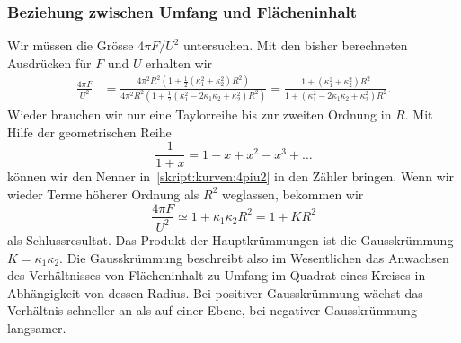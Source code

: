 \subsubsection{Beziehung zwischen Umfang und Flächeninhalt}
Wir müssen die Grösse $4\pi F/U^2$ untersuchen.
Mit den bisher berechneten Ausdrücken für $F$ und $U$ erhalten wir
\begin{align}
\frac{4\pi F}{U^2}
&=
\frac{4\pi^2R^2(1+{\textstyle\frac12}(\kappa_1^2 + \kappa_2^2)R^2)}%
{4\pi^2 R^2(1+{\textstyle\frac12}(\kappa_1^2-2\kappa_1\kappa_2+\kappa_2^2)R^2)}
=
\frac{1+(\kappa_1^2 + \kappa_2^2)R^2}%
{1+(\kappa_1^2-2\kappa_1\kappa_2+\kappa_2^2)R^2}.
\label{skript:kurven:4piu2}
\end{align}
Wieder brauchen wir nur eine Taylorreihe bis zur zweiten Ordnung in $R$.
Mit Hilfe der geometrischen Reihe 
\[
\frac1{1+x}= 1-x+x^2-x^3+\dots
\]
können wir den Nenner in~\eqref{skript:kurven:4piu2} in den Zähler
bringen.
Wenn wir wieder Terme höherer Ordnung als $R^2$ weglassen, bekommen
wir 
\begin{equation}
\frac{4\pi F}{U^2}
\simeq
1+\kappa_1\kappa_2R^2
=
1 + KR^2
\end{equation}
als Schlussresultat.
Das Produkt der Hauptkrümmungen ist die Gausskrümmung $K=\kappa_1\kappa_2$.
Die Gausskrümmung beschreibt also im Wesentlichen das Anwachsen des
Verhältnisses von Flächeninhalt zu Umfang im Quadrat eines Kreises
in Abhängigkeit von dessen Radius.
Bei positiver Gausskrümmung wächst das Verhältnis schneller an
als auf einer Ebene, bei negativer Gausskrümmung langsamer.





